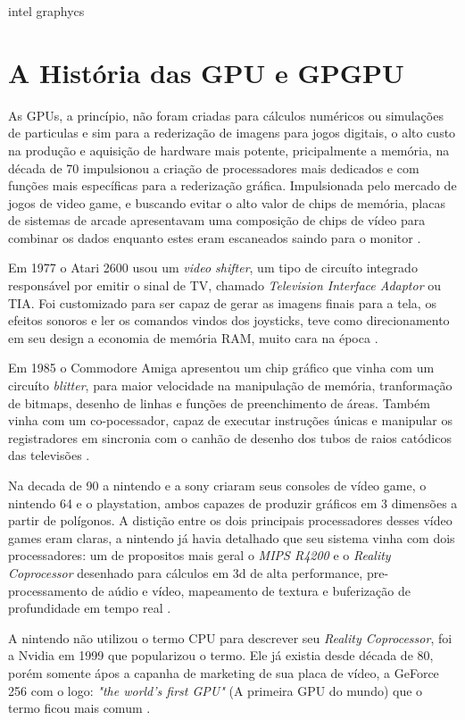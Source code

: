   intel graphycs



\section{A História das GPU e GPGPU}
  As GPUs, a princípio, não foram criadas para cálculos numéricos ou simulações de particulas e sim para a rederização de imagens para jogos digitais, o alto custo na produção e aquisição de hardware mais potente, pricipalmente a memória, na década de 70 impulsionou a criação de processadores mais dedicados e com funções mais específicas para a rederização gráfica. Impulsionada pelo mercado de jogos de video game, e buscando evitar o alto valor de chips de memória, placas de sistemas de arcade apresentavam uma composição de chips de vídeo para combinar os dados enquanto estes eram escaneados saindo para o monitor \citep{Hague:13}.

  Em 1977 o Atari 2600 usou um \textit{video shifter}, um tipo de circuíto integrado responsável por emitir o sinal de TV, chamado \textit{Television Interface Adaptor} ou TIA. Foi customizado para ser capaz de gerar as imagens finais para a tela, os efeitos sonoros e ler os comandos vindos dos joysticks, teve como direcionamento em seu design a economia de memória RAM, muito cara na época \citep{Hague:13} \citep{atari-field:83}.

  Em 1985 o Commodore Amiga apresentou um chip gráfico que vinha com um circuíto \textit{blitter}, para maior velocidade na manipulação de memória, tranformação de bitmaps, desenho de linhas e funções de preenchimento de áreas. Também vinha com um co-pocessador, capaz de executar instruções únicas e manipular os registradores em sincronia com o canhão de desenho dos tubos de raios catódicos das televisões \citep{amiga:17}.

  Na decada de 90 a nintendo e a sony criaram seus consoles de vídeo game, o nintendo 64 e o playstation, ambos capazes de produzir gráficos em 3 dimensões a partir de polígonos. A distição entre os dois principais processadores desses vídeo games eram claras, a nintendo já havia detalhado que seu sistema vinha com dois processadores: um de propositos mais geral o \textit{MIPS R4200} e o \textit{Reality Coprocessor} desenhado para cálculos em 3d de alta performance, pre-processamento de aúdio e vídeo, mapeamento de textura e buferização de profundidade em tempo real \citep{manual64:98} \citep{N64Launch:96}.

  A nintendo não utilizou o termo CPU para descrever seu \textit{Reality Coprocessor}, foi a Nvidia em 1999 que popularizou o termo. Ele já existia desde década de 80, porém somente ápos a capanha de marketing de sua placa de vídeo, a GeForce 256 com o logo: \textit{"the world's first GPU"} (A primeira GPU do mundo) que o termo ficou mais comum \citep{nvida256}.

